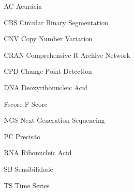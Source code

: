 
\begin{siglas}
    \item[AC] Acurácia
    \item[CBS] Circular Binary Segmentation
    \item[CNV] Copy Number Variation
    \item[CRAN] Comprehensive R Archive Network
    \item[CPD] Change Point Detection
    \item[DNA] Deoxyribonucleic Acid
    \item[Fscore] F-Score
    \item[NGS] Next-Generation Sequencing
    \item[PC] Precisão
    \item[RNA] Ribonucleic Acid
    \item[SB] Sensibilidade
    \item[TS] Time Series
\end{siglas}

